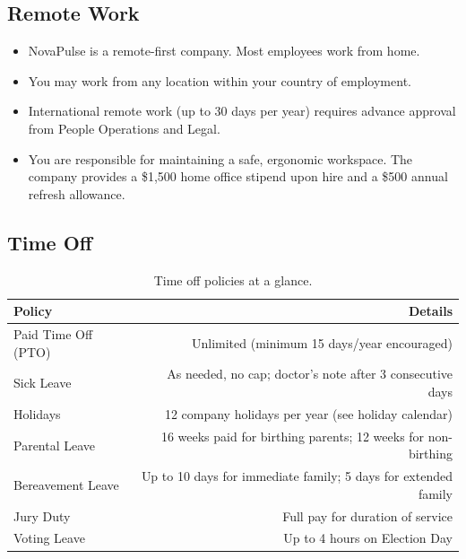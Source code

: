 \documentclass[
    language=english,
    doctype=employee-handbook,
    institution=none,
]{../../omnilatex}
\begin{document}
\subsection{Remote Work}

\begin{itemize}
    \item NovaPulse is a remote-first company. Most employees work from home.
    \item You may work from any location within your country of employment.
    \item International remote work (up to 30 days per year) requires
          advance approval from People Operations and Legal.
    \item You are responsible for maintaining a safe, ergonomic workspace.
          The company provides a \$1,500 home office stipend upon hire and
          a \$500 annual refresh allowance.
\end{itemize}

\subsection{Time Off}

\begin{table}[h]
    \centering
    \begin{tabular}{lr}
        \toprule
        \textbf{Policy} & \textbf{Details} \\
        \midrule
        Paid Time Off (PTO)       & Unlimited (minimum 15 days/year encouraged) \\
        Sick Leave                & As needed, no cap; doctor's note after 3 consecutive days \\
        Holidays                 & 12 company holidays per year (see holiday calendar) \\
        Parental Leave           & 16 weeks paid for birthing parents; 12 weeks for non-birthing \\
        Bereavement Leave        & Up to 10 days for immediate family; 5 days for extended family \\
        Jury Duty                & Full pay for duration of service \\
        Voting Leave             & Up to 4 hours on Election Day \\
        \bottomrule
    \end{tabular}
    \caption{Time off policies at a glance.}
\end{table}
\end{document}

